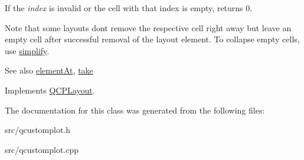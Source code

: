 If the {\itshape index} is invalid or the cell with that index is empty, returns 0.

Note that some layouts don\textquotesingle{}t remove the respective cell right away but leave an empty cell after successful removal of the layout element. To collapse empty cells, use \hyperlink{classQCPLayoutInset_a18b7d508f0baa60cc5dcb1343cf7f32a}{simplify}.

\begin{DoxySeeAlso}{See also}
\hyperlink{classQCPLayoutInset_a881ca205605bae9c034733b808f93a02}{element\+At}, \hyperlink{classQCPLayoutInset_af7f13cc369f8190b5e7e17d5f39dfe1c}{take} 
\end{DoxySeeAlso}


Implements \hyperlink{classQCPLayout_a5a79621fa0a6eabb8b520cfc04fb601a}{Q\+C\+P\+Layout}.



The documentation for this class was generated from the following files\+:\begin{DoxyCompactItemize}
\item 
src/qcustomplot.\+h\item 
src/qcustomplot.\+cpp\end{DoxyCompactItemize}

